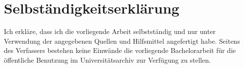 \chapter{Selbständigkeitserklärung}
Ich erkläre, dass ich die vorliegende Arbeit selbstständig und nur unter Verwendung der angegebenen Quellen und Hilfsmittel angefertigt habe.
Seitens des Verfassers bestehen keine Einwände die vorliegende Bachelorarbeit für die öffentliche Benutzung im Universitätsarchiv zur Verfügung zu stellen.
